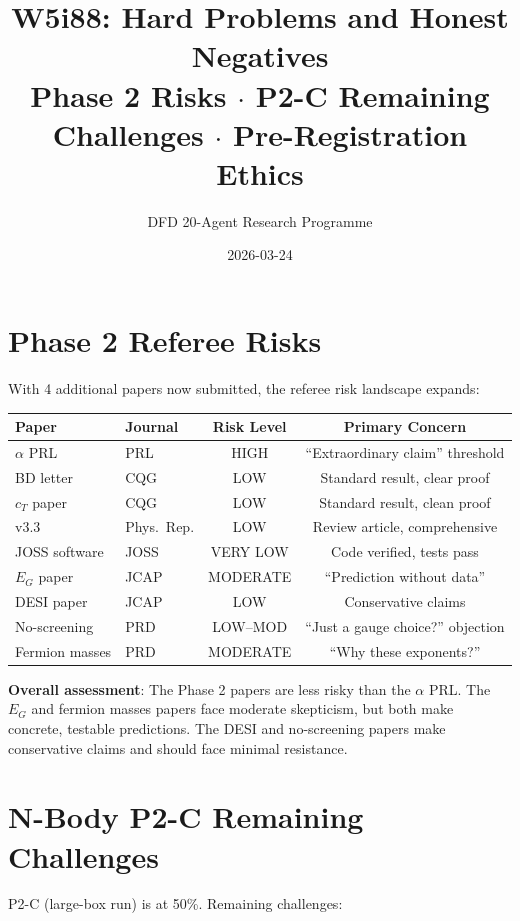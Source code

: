 \documentclass[11pt,a4paper]{article}
\title{W5i88: Hard Problems and Honest Negatives\\[6pt]
\large Phase 2 Risks $\cdot$ P2-C Remaining Challenges $\cdot$ Pre-Registration Ethics}
\author{DFD 20-Agent Research Programme}
\date{2026-03-24}
\begin{document}
\maketitle

\section{Phase 2 Referee Risks}

With 4 additional papers now submitted, the referee risk landscape expands:

\begin{center}
\begin{tabular}{llcc}
\toprule
\textbf{Paper} & \textbf{Journal} & \textbf{Risk Level} & \textbf{Primary Concern} \\
\midrule
$\alpha$ PRL & PRL & HIGH & ``Extraordinary claim'' threshold \\
BD letter & CQG & LOW & Standard result, clear proof \\
$c_T$ paper & CQG & LOW & Standard result, clean proof \\
v3.3 & Phys.\ Rep. & LOW & Review article, comprehensive \\
JOSS software & JOSS & VERY LOW & Code verified, tests pass \\
$E_G$ paper & JCAP & MODERATE & ``Prediction without data'' \\
DESI paper & JCAP & LOW & Conservative claims \\
No-screening & PRD & LOW--MOD & ``Just a gauge choice?'' objection \\
Fermion masses & PRD & MODERATE & ``Why these exponents?'' \\
\bottomrule
\end{tabular}
\end{center}

\textbf{Overall assessment}: The Phase 2 papers are less risky than the $\alpha$ PRL. The $E_G$ and fermion masses papers face moderate skepticism, but both make concrete, testable predictions. The DESI and no-screening papers make conservative claims and should face minimal resistance.

\section{N-Body P2-C Remaining Challenges}

P2-C (large-box run) is at 50\%. Remaining challenges:
\end{document}
